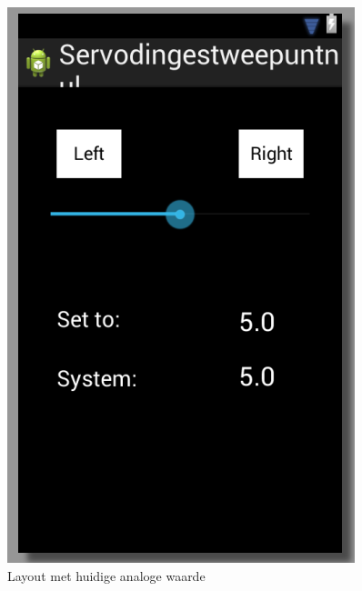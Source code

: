 \documentclass[a4paper]{article}
\begin{document}
	\begin{figure}[h]
		\centering
		\includegraphics[scale=0.6]{imgs/layout2.png}
		\caption{Layout met huidige analoge waarde}
		\label{fig:layout2}
	\end{figure}
		\newpage
\end{document}
